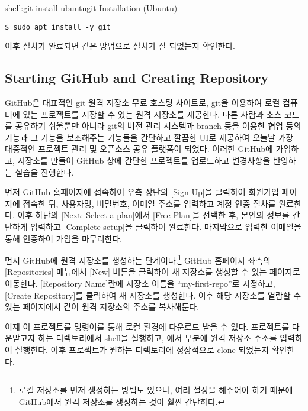 \begin{shellenv}{shell:git-install-ubuntu}{git Installation (Ubuntu)}\begin{verbatim}
$ sudo apt install -y git
\end{verbatim}
\end{shellenv}

이후 설치가 완료되면 \과 같은 방법으로 설치가 잘 되었는지 확인한다.
\newpage

\subsection*{Starting GitHub and Creating Repository}

GitHub은 대표적인 git 원격 저장소 무료 호스팅 사이트로, git을 이용하여 로컬 컴퓨터에 있는 프로젝트를 저장할 수 있는 원격 저장소를 제공한다. 다른 사람과 소스 코드를 공유하기 쉬울뿐만 아니라 git의 버전 관리 시스템과 branch 등을 이용한 협업 등의 기능과 그 기능을 보조해주는 기능들을 간단하고 깔끔한 UI로 제공하여 오늘날 가장 대중적인 프로젝트 관리 및 오픈소스 공유 플랫폼이 되었다. 이러한 GitHub에 가입하고, 저장소를 만들어 GitHub 상에 간단한 프로젝트를 업로드하고 변경사항을 반영하는 실습을 진행한다.

먼저 GitHub 홈페이지에 접속하여 우측 상단의 [Sign Up]을 클릭하여 회원가입 페이지에 접속한 뒤, 사용자명, 비밀번호, 이메일 주소를 입력하고 계정 인증 절차를 완료한다. 이후 하단의 [Next: Select a plan]에서 [Free Plan]을 선택한 후, 본인의 정보를 간단하게 입력하고 [Complete setup]을 클릭하여 완료한다. 마지막으로 입력한 이메일을 통해 인증하여 가입을 마무리한다.

먼저 GitHub에 원격 저장소를 생성하는 단계이다.\footnote{로컬 저장소를 먼저 생성하는 방법도 있으나, 여러 설정을 해주어야 하기 때문에 GitHub에서 원격 저장소를 생성하는 것이 훨씬 간단하다.} GitHub 홈페이지 좌측의 [Repositories] 메뉴에서 [New] 버튼을 클릭하여 새 저장소를 생성할 수 있는 페이지로 이동한다. [Repository Name]란에 저장소 이름을 ``my-first-repo''로 지정하고, [Create Repository]를 클릭하여 새 저장소를 생성한다. 이후 해당 저장소를 열람할 수 있는 페이지에서 \과 같이 원격 저장소의 주소를 복사해둔다.


이제 이 프로젝트를  명령어를 통해 로컬 환경에 다운로드 받을 수 있다. 프로젝트를 다운받고자 하는 디렉토리에서 shell을 실행하고, 에서  부분에 원격 저장소 주소를 입력하여 실행한다. 이후 프로젝트가 원하는 디렉토리에 정상적으로 clone 되었는지 확인한다.

